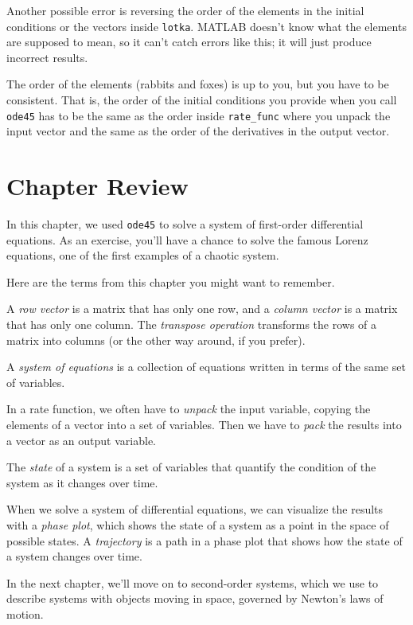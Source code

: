 
Another possible error is reversing the order of the elements in the
initial conditions or the vectors inside \lstinline{lotka}.  MATLAB
doesn't know what the elements are supposed to mean, so it can't catch
errors like this; it will just produce incorrect results.

The order of the elements (rabbits and foxes) is up to you, but
you have to be consistent.  That is, the order of the initial conditions you
provide when you call \lstinline{ode45} has to be the same as the order
inside \lstinline{rate_func} where you unpack the input vector and the
same as the order of the derivatives in the output vector.

\section{Chapter Review}

In this chapter, we used \lstinline{ode45} to solve a system of first-order differential equations.
As an exercise, you'll have a chance to solve the famous Lorenz equations, one of the first examples of a chaotic system.

Here are the terms from this chapter you might want to remember.

A \emph{row vector} is a matrix that has only one row, and a \emph{column vector} is a matrix that has only one column.
The \emph{transpose operation} transforms the  rows of a matrix
into columns (or the other way around, if you prefer).

A \emph{system of equations} is a collection of equations written in terms of
the same set of variables.

In a rate function, we often have to \emph{unpack} the input variable,
copying the elements of a vector into a set of variables.
Then we have to \emph{pack} the results into a vector as an output variable.

The \emph{state} of a system is a set of variables that quantify the condition of the system as it changes over time.

When we solve a system of differential equations, we can visualize the results with a \emph{phase plot}, which shows the state of a system as a point in the space of possible states.
A \emph{trajectory} is a path in a phase plot that shows how the state of a system changes over time.

In the next chapter, we'll move on to second-order systems, which we use to describe systems
with objects moving in space, governed by Newton's laws of motion.


